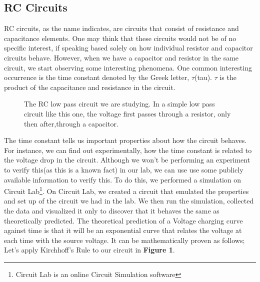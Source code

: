 \documentclass[twocolumn]{article}\usepackage[english]{babel}
\begin{document}
\subsection{RC Circuits}
RC circuits, as the name indicates, are circuits that consist of resistance and capacitance elements. One may think that these circuits would not be of no specific interest, if speaking based solely on how individual resistor and capacitor circuits behave. However, when we have a capacitor and resistor in the same circuit, we start observing some interesting phenomena. One common interesting occurrence is the time constant denoted by the Greek letter, $\tau$(tau). $\tau$ is the product of the capacitance and resistance in the circuit.
\newline
\newline
\newline
\begin{figure}
\caption{The RC low pass circuit we are studying. In a simple low pass circuit like this one, the voltage first passes through a resistor, only then after,through a capacitor. }
\label{fig:Low Pass Cir}
\end{figure}

The time constant tells us important properties about how the circuit behaves. For instance, we can find out experimentally, how the time constant is related to the voltage drop in the circuit. Although we won't be performing an experiment to verify this(as this is a known fact) in our lab, we can use use some publicly available information to verify this. To do this, we performed a simulation on Circuit Lab\footnote{Circuit Lab is an online Circuit Simulation software}. On Circuit Lab, we created a circuit that emulated the properties and set up of the circuit we had in the lab. We then run the simulation, collected the data and visualized it only to discover that it behaves the same as theoretically predicted.
\newline
\newline
The theoretical prediction of a Voltage charging curve against time is that it will be an exponential curve that relates the voltage at each time with the source voltage. It can be mathematically proven as follows;
Let's apply Kirchhoff's Rule to our circuit in \textbf{Figure 1}.\newline
\end{document}
